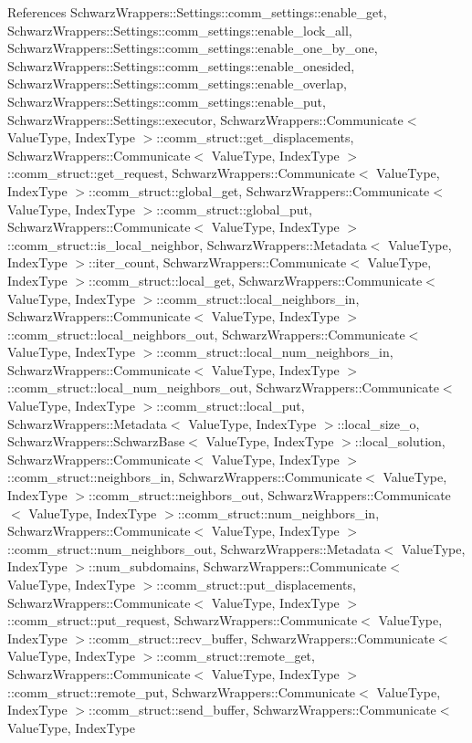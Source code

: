 References Schwarz\+Wrappers\+::\+Settings\+::comm\+\_\+settings\+::enable\+\_\+get, Schwarz\+Wrappers\+::\+Settings\+::comm\+\_\+settings\+::enable\+\_\+lock\+\_\+all, Schwarz\+Wrappers\+::\+Settings\+::comm\+\_\+settings\+::enable\+\_\+one\+\_\+by\+\_\+one, Schwarz\+Wrappers\+::\+Settings\+::comm\+\_\+settings\+::enable\+\_\+onesided, Schwarz\+Wrappers\+::\+Settings\+::comm\+\_\+settings\+::enable\+\_\+overlap, Schwarz\+Wrappers\+::\+Settings\+::comm\+\_\+settings\+::enable\+\_\+put, Schwarz\+Wrappers\+::\+Settings\+::executor, Schwarz\+Wrappers\+::\+Communicate$<$ Value\+Type, Index\+Type $>$\+::comm\+\_\+struct\+::get\+\_\+displacements, Schwarz\+Wrappers\+::\+Communicate$<$ Value\+Type, Index\+Type $>$\+::comm\+\_\+struct\+::get\+\_\+request, Schwarz\+Wrappers\+::\+Communicate$<$ Value\+Type, Index\+Type $>$\+::comm\+\_\+struct\+::global\+\_\+get, Schwarz\+Wrappers\+::\+Communicate$<$ Value\+Type, Index\+Type $>$\+::comm\+\_\+struct\+::global\+\_\+put, Schwarz\+Wrappers\+::\+Communicate$<$ Value\+Type, Index\+Type $>$\+::comm\+\_\+struct\+::is\+\_\+local\+\_\+neighbor, Schwarz\+Wrappers\+::\+Metadata$<$ Value\+Type, Index\+Type $>$\+::iter\+\_\+count, Schwarz\+Wrappers\+::\+Communicate$<$ Value\+Type, Index\+Type $>$\+::comm\+\_\+struct\+::local\+\_\+get, Schwarz\+Wrappers\+::\+Communicate$<$ Value\+Type, Index\+Type $>$\+::comm\+\_\+struct\+::local\+\_\+neighbors\+\_\+in, Schwarz\+Wrappers\+::\+Communicate$<$ Value\+Type, Index\+Type $>$\+::comm\+\_\+struct\+::local\+\_\+neighbors\+\_\+out, Schwarz\+Wrappers\+::\+Communicate$<$ Value\+Type, Index\+Type $>$\+::comm\+\_\+struct\+::local\+\_\+num\+\_\+neighbors\+\_\+in, Schwarz\+Wrappers\+::\+Communicate$<$ Value\+Type, Index\+Type $>$\+::comm\+\_\+struct\+::local\+\_\+num\+\_\+neighbors\+\_\+out, Schwarz\+Wrappers\+::\+Communicate$<$ Value\+Type, Index\+Type $>$\+::comm\+\_\+struct\+::local\+\_\+put, Schwarz\+Wrappers\+::\+Metadata$<$ Value\+Type, Index\+Type $>$\+::local\+\_\+size\+\_\+o, Schwarz\+Wrappers\+::\+Schwarz\+Base$<$ Value\+Type, Index\+Type $>$\+::local\+\_\+solution, Schwarz\+Wrappers\+::\+Communicate$<$ Value\+Type, Index\+Type $>$\+::comm\+\_\+struct\+::neighbors\+\_\+in, Schwarz\+Wrappers\+::\+Communicate$<$ Value\+Type, Index\+Type $>$\+::comm\+\_\+struct\+::neighbors\+\_\+out, Schwarz\+Wrappers\+::\+Communicate$<$ Value\+Type, Index\+Type $>$\+::comm\+\_\+struct\+::num\+\_\+neighbors\+\_\+in, Schwarz\+Wrappers\+::\+Communicate$<$ Value\+Type, Index\+Type $>$\+::comm\+\_\+struct\+::num\+\_\+neighbors\+\_\+out, Schwarz\+Wrappers\+::\+Metadata$<$ Value\+Type, Index\+Type $>$\+::num\+\_\+subdomains, Schwarz\+Wrappers\+::\+Communicate$<$ Value\+Type, Index\+Type $>$\+::comm\+\_\+struct\+::put\+\_\+displacements, Schwarz\+Wrappers\+::\+Communicate$<$ Value\+Type, Index\+Type $>$\+::comm\+\_\+struct\+::put\+\_\+request, Schwarz\+Wrappers\+::\+Communicate$<$ Value\+Type, Index\+Type $>$\+::comm\+\_\+struct\+::recv\+\_\+buffer, Schwarz\+Wrappers\+::\+Communicate$<$ Value\+Type, Index\+Type $>$\+::comm\+\_\+struct\+::remote\+\_\+get, Schwarz\+Wrappers\+::\+Communicate$<$ Value\+Type, Index\+Type $>$\+::comm\+\_\+struct\+::remote\+\_\+put, Schwarz\+Wrappers\+::\+Communicate$<$ Value\+Type, Index\+Type $>$\+::comm\+\_\+struct\+::send\+\_\+buffer, Schwarz\+Wrappers\+::\+Communicate$<$ Value\+Type, Index\+Type 